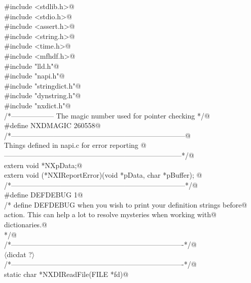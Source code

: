 \documentclass[12pt]{article}
\begin{document}
{\begin{flushleft}
\begin{minipage}{\linewidth}
\begin{list}{}{}
\mbox{}\verb@#include <stdlib.h>@\\
\mbox{}\verb@#include <stdio.h>@\\
\mbox{}\verb@#include <assert.h>@\\
\mbox{}\verb@#include <string.h>@\\
\mbox{}\verb@#include <time.h>@\\
\mbox{}\verb@#include <mfhdf.h>@\\
\mbox{}\verb@#include "lld.h"@\\
\mbox{}\verb@#include "napi.h"@\\
\mbox{}\verb@#include "stringdict.h"@\\
\mbox{}\verb@#include "dynstring.h"@\\
\mbox{}\verb@#include "nxdict.h"@\\
\mbox{}\verb@/*------------------ The magic number used for pointer checking */@\\
\mbox{}\verb@#define NXDMAGIC 260558@\\
\mbox{}\verb@/*--------------------------------------------------------------------------@\\
\mbox{}\verb@      Things defined in napi.c for error reporting @\\
\mbox{}\verb@---------------------------------------------------------------------------*/@\\
\mbox{}\verb@       extern void *NXpData;@\\
\mbox{}\verb@       extern void (*NXIReportError)(void *pData, char *pBuffer);  @\\
\mbox{}\verb@/*--------------------------------------------------------------------------*/@\\
\mbox{}\verb@#define DEFDEBUG 1@\\
\mbox{}\verb@/* define DEFDEBUG when you wish to print your definition strings before@\\
\mbox{}\verb@   action. This can help a lot to resolve mysteries when working with@\\
\mbox{}\verb@   dictionaries.@\\
\mbox{}\verb@*/@\\
\mbox{}\verb@/*-------------------------------------------------------------------------*/@\\
\mbox{}\verb@@$\langle$dicdat {\footnotesize ?}$\rangle$\verb@@\\
\mbox{}\verb@/*-------------------------------------------------------------------------*/@\\
\mbox{}\verb@  static char *NXDIReadFile(FILE *fd)@\\

\end{list}
\end{minipage}
\end{flushleft}}
\end{document}
